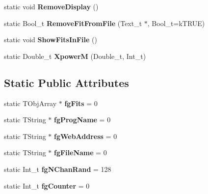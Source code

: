 \begin{DoxyCompactItemize}
\item 
\hypertarget{classTSplineFit_a81be2932f031b3014989827b6c70196d}{
static void {\bfseries RemoveDisplay} ()}
\label{classTSplineFit_a81be2932f031b3014989827b6c70196d}

\item 
\hypertarget{classTSplineFit_a49f38b73b643d7a6093e140863be10ca}{
static Bool\_\-t {\bfseries RemoveFitFromFile} (Text\_\-t $\ast$, Bool\_\-t=kTRUE)}
\label{classTSplineFit_a49f38b73b643d7a6093e140863be10ca}

\item 
\hypertarget{classTSplineFit_ae93a04f8bcc1445995b45304ad4fac60}{
static void {\bfseries ShowFitsInFile} ()}
\label{classTSplineFit_ae93a04f8bcc1445995b45304ad4fac60}

\item 
\hypertarget{classTSplineFit_ac5634a12c11d23d272498e0065af9725}{
static Double\_\-t {\bfseries XpowerM} (Double\_\-t, Int\_\-t)}
\label{classTSplineFit_ac5634a12c11d23d272498e0065af9725}

\end{DoxyCompactItemize}
\subsection*{Static Public Attributes}
\begin{DoxyCompactItemize}
\item 
\hypertarget{classTSplineFit_aece868923fa0c00f09828f92b7ba22ff}{
static TObjArray $\ast$ {\bfseries fgFits} = 0}
\label{classTSplineFit_aece868923fa0c00f09828f92b7ba22ff}

\item 
\hypertarget{classTSplineFit_a78569a7c71ace9f8078b77c65dcf31f5}{
static TString $\ast$ {\bfseries fgProgName} = 0}
\label{classTSplineFit_a78569a7c71ace9f8078b77c65dcf31f5}

\item 
\hypertarget{classTSplineFit_a905e6ab3e4c39b3a02e0920a909ad65e}{
static TString $\ast$ {\bfseries fgWebAddress} = 0}
\label{classTSplineFit_a905e6ab3e4c39b3a02e0920a909ad65e}

\item 
\hypertarget{classTSplineFit_a4b625d3f44c3c79bb152196fba32852f}{
static TString $\ast$ {\bfseries fgFileName} = 0}
\label{classTSplineFit_a4b625d3f44c3c79bb152196fba32852f}

\item 
\hypertarget{classTSplineFit_abb0f4b726e7642b1e1322b698221bf0d}{
static Int\_\-t {\bfseries fgNChanRand} = 128}
\label{classTSplineFit_abb0f4b726e7642b1e1322b698221bf0d}

\item 
\hypertarget{classTSplineFit_aff9679956135672c33a5af87d48488a3}{
static Int\_\-t {\bfseries fgCounter} = 0}
\label{classTSplineFit_aff9679956135672c33a5af87d48488a3}

\end{DoxyCompactItemize}
